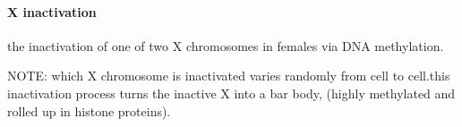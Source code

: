 \documentclass[]{article}
\let\oldparagraph\paragraph
\renewcommand{\paragraph}[1]{\oldparagraph{#1}\mbox{}}
\begin{document}
\hypertarget{x-inactivation-1}{%
\paragraph{X inactivation}\label{x-inactivation-1}}

the inactivation of one of two X chromosomes in females via DNA
methylation.

NOTE: which X chromosome is inactivated varies randomly from cell to
cell.this inactivation process turns the inactive X into a bar body,
(highly methylated and rolled up in histone proteins).
\end{document}
